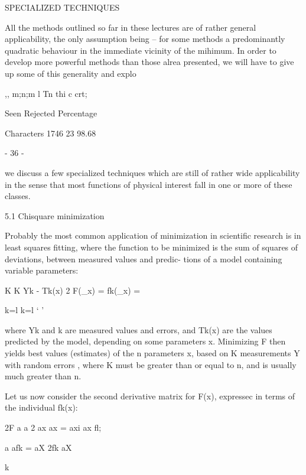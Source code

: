  
 
SPECIALIZED TECHNIQUES
 
          All the methods outlined so far in these lectures are of rather
     general applicability, the only assumption being -- for some methods
     a predominantly quadratic behaviour in the immediate vicinity of the
      mihimum.  In order to develop more powerful methods than those alrea
     presented, we will have to give up some of this generality and explo
 
                                  ,, m;n;m   l  Tn  thi c  crt;
 
                 Seen Rejected  Percentage
 
Characters       1746       23   98.68
 
                                 - 36 -
 
 
we discuss a few specialized techniques which are still of rather wide
applicability in the sense that most functions of physical interest
fall in one or more of these classes.
 
5.1  Chisquare minimization
 
     Probably the most common application of minimization in scientific
research is in least squares fitting, where the function to be minimized
is the sum of squares of deviations, between measured values and predic-
tions of a model containing variable parameters:
 
 
                          K           K   Yk - Tk(x) 2
                 F(_x) =   fk(_x) =
 
                     k=l         k=l `         '
 
 
where Yk and k are measured values and errors, and Tk(x) are the values
predicted by the model, depending on some parameters x.  Minimizing F
then yields best values (estimates) of the n parameters x, based on K
measurements Y with random errors , where K must be greater than or
equal to n, and is usually much greater than n.
 
     Let us now consider the second derivative matrix for F(x), expressec
in terms of the individual fk(x):
 
                 2F a a 2
              ax ax  = axi ax   fl;
 
 
 
                                           a        afk
                    = aX  2fk aX
 
                              k
 
 
 
